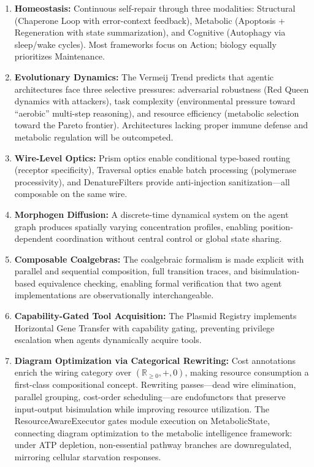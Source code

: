 \begin{enumerate}[leftmargin=*]
\item \textbf{Homeostasis:} Continuous self-repair through three modalities: Structural (Chaperone Loop with
error-context feedback), Metabolic (Apoptosis + Regeneration with state summarization), and Cognitive
(Autophagy via sleep/wake cycles). Most frameworks focus on Action; biology equally prioritizes Maintenance.

\item \textbf{Evolutionary Dynamics:} The Vermeij Trend predicts that agentic architectures face three
selective pressures: adversarial robustness (Red Queen dynamics with attackers), task complexity
(environmental pressure toward ``aerobic'' multi-step reasoning), and resource efficiency (metabolic
selection toward the Pareto frontier). Architectures lacking proper immune defense and metabolic regulation
will be outcompeted.

\item \textbf{Wire-Level Optics:} Prism optics enable conditional type-based routing (receptor specificity),
Traversal optics enable batch processing (polymerase processivity), and DenatureFilters provide
anti-injection sanitization---all composable on the same wire.

\item \textbf{Morphogen Diffusion:} A discrete-time dynamical system on the agent graph produces spatially
varying concentration profiles, enabling position-dependent coordination without central control or global
state sharing.

\item \textbf{Composable Coalgebras:} The coalgebraic formalism is made explicit with parallel and sequential
composition, full transition traces, and bisimulation-based equivalence checking, enabling formal
verification that two agent implementations are observationally interchangeable.

\item \textbf{Capability-Gated Tool Acquisition:} The Plasmid Registry implements Horizontal Gene Transfer
with capability gating, preventing privilege escalation when agents dynamically acquire tools.

\item \textbf{Diagram Optimization via Categorical Rewriting:} Cost annotations enrich the wiring category
over $(\mathbb{R}_{\geq 0}, +, 0)$, making resource consumption a first-class compositional concept.
Rewriting passes---dead wire elimination, parallel grouping, cost-order scheduling---are endofunctors
that preserve input-output bisimulation while improving resource utilization. The ResourceAwareExecutor
gates module execution on MetabolicState, connecting diagram optimization to the metabolic intelligence
framework: under ATP depletion, non-essential pathway branches are downregulated, mirroring cellular
starvation responses.
\end{enumerate}

